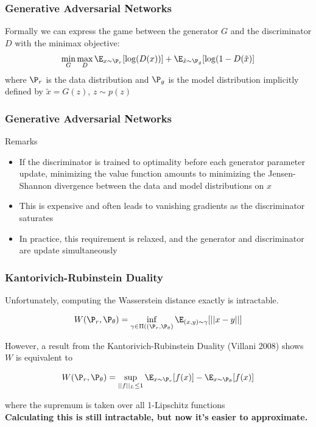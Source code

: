 \documentclass{beamer}
\begin{document}
\begin{frame}
\frametitle{Generative Adversarial Networks}
\vspace{-0.6in}
Formally we can express the game between the generator $G$ and the discriminator $D$ with the minimax objective:
\vspace{0.2in}
$$ \min_{G} \max_{D} \E_{x \sim \P_{r}} [\log(D(x))] + \E_{\tilde{x} \sim \P_{g}} [\log(1 - D(\tilde{x})] $$
where $\P_{r}$ is the data distribution and $\P_{g}$ is the model distribution implicitly defined by $\tilde{x} = G(z)$, $z \sim p(z)$

\end{frame}


\begin{frame}
\frametitle{Generative Adversarial Networks}

\begin{block}{Remarks}
\begin{itemize}
\pause
\item{If the discriminator is trained to optimality before each generator parameter update, minimizing the value function amounts to minimizing the Jensen-Shannon divergence between the data and model distributions on $x$}
\pause
\item{This is expensive and often leads to vanishing gradients as the discriminator saturates}
\pause
\item{In practice, this requirement is relaxed, and the generator and discriminator are update simultaneously}
\end{itemize}
\end{block}


\end{frame}



\begin{frame}
\frametitle{Kantorivich-Rubinstein Duality}
Unfortunately, computing the Wasserstein distance exactly is intractable.

$$ W(\P_{r},\P_{\theta}) = \inf_{\gamma \in \Pi((\P_{r},\P_{\theta})} \E_{(x,y) \sim \gamma} [ ||x-y|| ] $$

\pause
However, a result from the Kantorivich-Rubinstein Duality (Villani 2008)  shows $W$ is equivalent to

$$ W(\P_{r},\P_{\theta}) = \sup_{||f||_{L} \leq 1} \E_{x \sim \P_{r}}[f(x)] - \E_{x \sim \P_{\theta}}[f(x)] $$

where the supremum is taken over all 1-Lipschitz functions\\ \vspace{0.2in}
\pause
\textbf{Calculating this is still intractable, but now it's easier to approximate.}

\end{frame}
\end{document}
